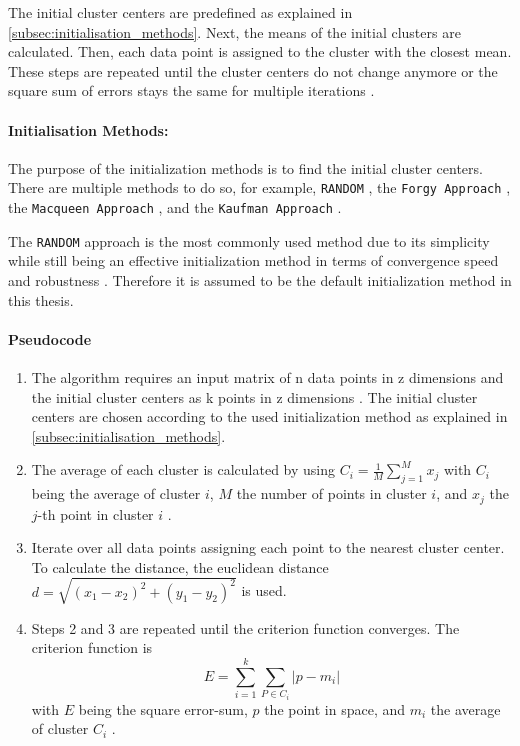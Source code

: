The initial cluster centers are predefined as explained in \autoref{subsec:initialisation_methods}.
Next, the means of the initial clusters are calculated.
Then, each data point is assigned to the cluster with the closest mean.
These steps are repeated until the cluster centers do not change anymore or the square sum of errors stays the same for multiple iterations \cite{HAR-KMA}.

\paragraph*{Initialisation Methods:}
\label{subsec:initialisation_methods}
The purpose of the initialization methods is to find the initial cluster centers.
There are multiple methods to do so, for example, \texttt{RANDOM} \cite{PEN-ECI}, the \texttt{Forgy Approach} \cite{AND-CAA}, the \texttt{Macqueen Approach} \cite{MCQ-MCA}, and the \texttt{Kaufman Approach} \cite{KAU-FGD}.

The \texttt{RANDOM} approach is the most commonly used method due to its simplicity while still being an effective initialization method in terms of convergence speed and robustness \cite{PEN-ECI}.
Therefore it is assumed to be the default initialization method in this thesis.

\paragraph*{Pseudocode}
\begin{enumerate}
    \item The algorithm requires an input matrix of n data points in z dimensions and the initial cluster centers as k points in z dimensions \cite{HAR-KMA}.
          The initial cluster centers are chosen according to the used initialization method as explained in \autoref{subsec:initialisation_methods}.
    \item The average of each cluster is calculated by using $C_i = \frac{1}{M} \sum_{j=1}^{M}x_j$ with $C_i$ being the average of cluster $i$, $M$ the number of points in cluster $i$, and $x_j$ the $j$-th point in cluster $i$ \cite{SYA-IKC}.
    \item Iterate over all data points assigning each point to the nearest cluster center.
          To calculate the distance, the euclidean distance $d = \sqrt{(x_1-x_2)^2+(y_1-y_2)^2}$ is used.
    \item Steps 2 and 3 are repeated until the criterion function converges.
          The criterion function is \begin{equation}\label{eq:sse}E=\sum_{i=1}^{k} \sum_{P \in C_i}|p-m_i|\end{equation} with $E$ being the square error-sum, $p$ the point in space, and $m_i$ the average of cluster $C_i$ \cite{LIU-BDE}.
\end{enumerate}

